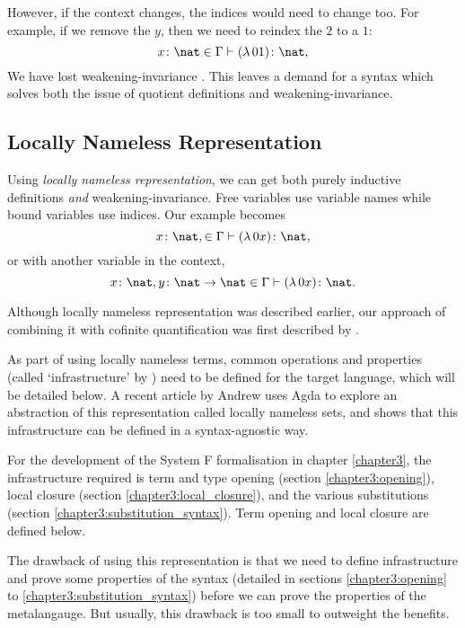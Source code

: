 However, if the context changes, the indices would need to change too. For example, if we remove the
$y$, then we need to reindex the $2$ to a $1$:
\begin{equation*}
  x \colon \nat \in \Gamma \vdash (\lambda \, 0 1) \colon \nat,
\end{equation*}
We have lost weakening-invariance \citep{aydemir_engineering_2008}. This leaves a demand for a
syntax which solves both the issue of quotient definitions and weakening-invariance.

\subsection{Locally Nameless Representation}
\label{section:background_locally_nameless}
Using \textit{locally nameless representation}, we can get both purely inductive definitions
\textit{and} weakening-invariance. Free variables use variable names while bound variables use
indices. Our example becomes
\begin{equation*}
  x \colon \nat, \in \Gamma \vdash (\lambda \, 0 x) \colon \nat,
\end{equation*}
or with another variable in the context,
\begin{equation*}
  x \colon \nat, y \colon \nat \to \nat \in \Gamma \vdash (\lambda \, 0 x) \colon \nat.
\end{equation*}

Although locally nameless representation was described earlier, our approach of combining it with
cofinite quantification was first described by \citet{aydemir_engineering_2008}.

As part of using locally nameless terms, common operations and properties (called `infrastructure'
by \citet{aydemir_engineering_2008}) need to be defined for the target language, which will be
detailed below. A recent article by Andrew \citet{pitts_locally_2023} uses Agda to explore an
abstraction of this representation called locally nameless sets, and shows that this infrastructure
can be defined in a syntax-agnostic way.

For the development of the System F formalisation in chapter \ref{chapter3}, the infrastructure
required is term and type opening (section \ref{chapter3:opening}), local closure (section
\ref{chapter3:local_closure}), and the various substitutions (section
\ref{chapter3:substitution_syntax}). Term opening and local closure are defined below.

The drawback of using this representation is that we need to define infrastructure and prove some
properties of the syntax (detailed in sections \ref{chapter3:opening} to
\ref{chapter3:substitution_syntax}) before we can prove the properties of the metalangauge. But
usually, this drawback is too small to outweight the benefits.

